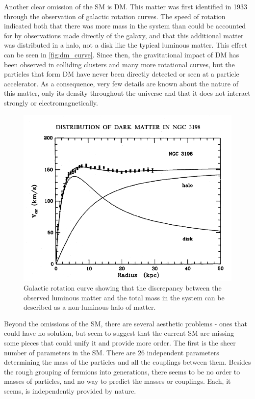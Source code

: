 Another clear omission of the \ac{SM} is \acf{DM}. This matter was first identified in 1933 through the observation of galactic rotation curves. \cite{zwicky} The speed of rotation indicated both that there was more mass in the system than could be accounted for by observations made directly of the galaxy, and that this additional matter was distributed in a halo, not a disk like the typical luminous matter. This effect can be seen in \autoref{fig:dm_curve}. Since then, the gravitational impact of \ac{DM} has been observed in colliding clusters and many more rotational curves, but the particles that form \ac{DM} have never been directly detected or seen at a particle accelerator. As a consequence, very few details are known about the nature of this matter, only its density throughout the universe and that it does not interact strongly or electromagnetically. 

\begin{centering}
\begin{figure}[bth]
\myfloatalign
\includegraphics[width=.85\linewidth]{figures/theory/rotatioanl_curve_ngc3198_rc.png}
\caption{Galactic rotation curve showing that the discrepancy between the observed luminous matter and the total mass in the system can be described as a non-luminous halo of matter. \cite{1985ApJ...295..305V}}
\label{fig:dm_curve}
\end{figure}
\end{centering}

Beyond the omissions of the \ac{SM}, there are several aesthetic problems - ones that could have no solution, but seem to suggest that the current \ac{SM} are missing some pieces that could unify it and provide more order. The first is the sheer number of parameters in the \ac{SM}. There are 26 independent parameters determining the mass of the particles and all the couplings between them. Besides the rough grouping of fermions into generations, there seems to be no order to masses of particles, and no way to predict the masses or couplings. Each, it seems, is independently provided by nature. 


